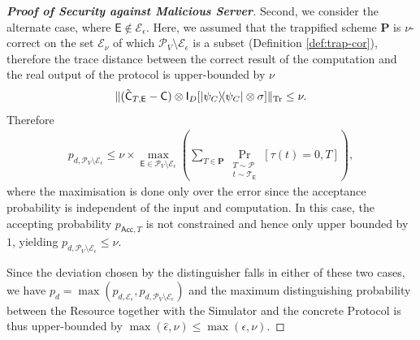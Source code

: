 \documentclass[12pt]{iopart}
\newcommand{\cptp}[1]{\mathsf{#1}} \newcommand{\pd}[1]{\mathcal{#1}}  \newcommand{\sch}[1]{\bm{#1}}
\newcommand{\Id}{\cptp{I}}
\renewcommand{\1}{\mathds{1}}
\newcommand{\acc}{\mathsf{Acc}}
\newcommand{\Cdev}[1]{\tilde{\cptp C}_{T, #1}}
\begin{document}
\begin{proof}[\bf Proof of Security against Malicious Server]
Second, we consider the alternate case, where $\cptp E \notin \mathcal E_\epsilon$. Here, we assumed that the trappified scheme $\sch P$ is $\nu$-correct on the set $\mathcal E_\nu$ of which $\mathcal P_V \setminus \mathcal E_\epsilon$ is a subset (Definition \ref{def:trap-cor}), therefore the trace distance between the correct result of the computation and the real output of the protocol is upper-bounded by $\nu$
\begin{align}
\|(\Cdev{\cptp E}  - \cptp C)\otimes\Id_D [\dyad{\psi_C} \otimes \sigma]\|_{\Tr} \leq \nu.
\end{align}
Therefore
\begin{align}
p_{d, \mathcal P_V \setminus \mathcal E_\epsilon} \leq \nu  \times \max_{\cptp E \in \mathcal P_V \setminus \mathcal E_\epsilon}(\sum_{T\in \sch P} \Pr_{\substack{T \sim \pd P \\ t\sim \pd T_{\cptp E}}}[\tau(t) = 0, T]),
\end{align}
where the maximisation is done only over the error since the acceptance probability is independent of the input and computation. In this case, the accepting probability $p_{\acc, T}$ is not constrained and hence only upper bounded by $1$, yielding $p_{d, \mathcal P_V \setminus \mathcal E_\epsilon} \leq \nu$.

Since the deviation chosen by the distinguisher falls in either of these two cases, we have $p_d = \max(p_{d, \mathcal E_\epsilon}, p_{d, \mathcal P_V \setminus \mathcal E_\epsilon})$ and the maximum distinguishing probability between the Resource together with the Simulator and the concrete Protocol is thus upper-bounded by $\max(\hat{\epsilon}, \nu) \leq \max(\epsilon, \nu)$.
\end{proof}
\end{document}
